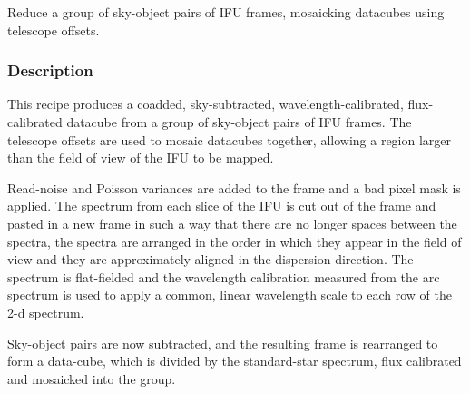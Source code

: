 \documentclass[twoside,11pt,nolof]{starlink}
\begin{document}
Reduce a group of sky-object pairs of IFU frames, mosaicking datacubes
using telescope offsets.

\subsubsection*{Description}

This recipe produces a coadded, sky-subtracted, wavelength-calibrated,
flux-calibrated datacube from a group of sky-object pairs of IFU
frames. The telescope offsets are used to mosaic datacubes together,
allowing a region larger than the field of view of the IFU to be
mapped.



Read-noise and Poisson variances are added to the frame and a bad
pixel mask is applied. The spectrum from each slice of the IFU is cut
out of the frame and pasted in a new frame in such a way that there
are no longer spaces between the spectra, the spectra are arranged in
the order in which they appear in the field of view and they are
approximately aligned in the dispersion direction. The spectrum is
flat-fielded and the wavelength calibration measured from the arc
spectrum is used to apply a common, linear wavelength scale to each
row of the 2-d spectrum.



Sky-object pairs are now subtracted, and the resulting frame is
rearranged to form a data-cube, which is divided by the standard-star
spectrum, flux calibrated and mosaicked into the group.
\end{document}
